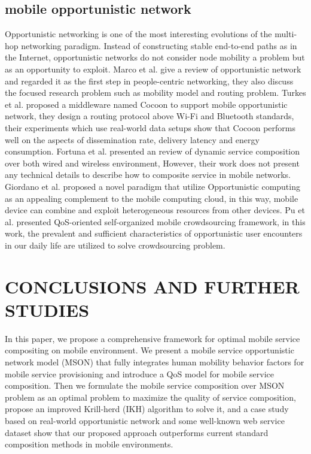 \documentclass[10pt,journal,compsoc]{IEEEtran}
\begin{document}
\subsection{mobile opportunistic network}
Opportunistic networking is one of the most interesting evolutions of the multi-hop networking paradigm. Instead of constructing stable end-to-end paths as in the Internet, opportunistic networks do not consider node mobility a problem but as an opportunity to exploit. 
Marco et al. \cite{Conti2014} give a review of opportunistic network and regarded it as the first step in people-centric networking, they also discuss the focused research problem such as mobility model and routing problem.
Turkes et al. \cite{turkes2016cocoon} proposed a middleware named Cocoon to support mobile opportunistic network, they design a routing protocol above Wi-Fi and Bluetooth standards, their experiments which use real-world data setups show that Cocoon performs well on the aspects of dissemination rate, delivery latency and energy consumption.
Fortuna et al. \cite{fortuna2009dynamic} presented an review of dynamic service composition over both wired and wireless environment, However, their work does not present any technical details to describe how to composite service in mobile networks.
Giordano et al. \cite{giordano2011human} proposed a novel paradigm that utilize Opportunistic computing as an appealing complement to the mobile computing cloud, in this way, mobile device can combine and exploit heterogeneous resources from other devices.
Pu et al. \cite{Pu2017crowd} presented QoS-oriented self-organized mobile crowdsourcing framework, in this work, the prevalent and sufficient characteristics of opportunistic user encounters in our daily life are utilized to solve crowdsourcing problem.
\section{CONCLUSIONS AND FURTHER STUDIES}
In this paper, we propose a comprehensive framework for optimal mobile service compositing on mobile environment. We present a mobile service opportunistic network model (MSON) that fully integrates human mobility behavior factors for mobile service provisioning and introduce a QoS model for mobile service composition. Then we formulate the mobile service composition over MSON problem as an optimal problem to maximize the quality of service composition, propose an improved Krill-herd (IKH) algorithm to solve it, and a case study based on real-world opportunistic network and some well-known web service dataset show that our proposed approach outperforms current standard composition methods in mobile environments.
\end{document}
